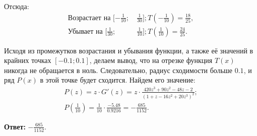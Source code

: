 \begin{solution}
Отсюда:
\begin{align*}
    \text{Возрастает на } [-\frac{1}{10}; \: &\frac{1}{30}]; T(-\frac{1}{10}) = \frac{18}{25}, \\
    \text{Убывает на } [\frac{1}{30}; \: &\frac{1}{10}]; T(\frac{1}{10}) = \frac{24}{25}.
\end{align*}

Исходя из промежутков возрастания и убывания функции, а также её значений в крайних точках \([-0.1; 0.1]\), делаем вывод, что на отрезке функция \(T(x)\) никогда не обращается в ноль. Следовательно, радиус сходимости больше \(0.1\), и ряд \(P(x)\) в этой точке будет сходится. Найдем его значение:
\begin{gather*}
    P(z) = z \cdot G'(z) = z \cdot \frac{420z^3 + 90z^2 - 48z - 2}{(1 + z - 16z^2 + 20z^3)^2}; \\
    P(\frac{1}{10}) = \frac{1}{10} \cdot \frac{-5.48}{0.9216} = -\frac{685}{1152}.
\end{gather*}

\textbf{Ответ:} \(\displaystyle -\frac{685}{1152}\).

\end{solution}
